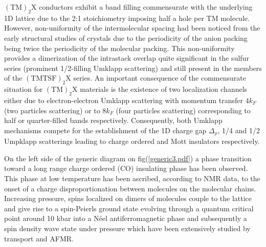 \documentclass[11pt]{article} %
\begin{document}
$\mathrm{(TM)_{2}X}$ conductors exhibit a band filling  commensurate with the underlying 1D lattice due to  the 2:1 stoichiometry  imposing half a hole per TM molecule. %
However,
non-uniformity of the intermolecular spacing  had been noticed from the early structural studies of \tfx crystals\cite{Ducasse86} due to the periodicity of the anion packing being twice the periodicity of the molecular packing. This non-uniformity provides a dimerization of the intrastack overlap  quite significant  in the sulfur series (prominent 1/2-filling Umklapp scattering)  and  still present in the members of the  
$\mathrm{(TMTSF)_{2}X}$ series. 
An important  consequence of the commensurate situation for $\mathrm{(TM)_{2}X}$ materials is the existence of two localization channels either due to electron-electron Umklapp scattering with momentum transfer $4k_F$ (two particles scattering) or to $8k_F$ (four particles scattering) corresponding to half or quarter-filled bands respectively\cite{Emery82,Giamarchi97}. Consequently, both Umklapp mechanisms compete for the establishment of the 1D charge gap $\Delta_{\rho}$, 1/4  and 1/2 Umpklapp scatterings leading to charge ordered and Mott insulators respectively\cite{Tsuchiizu01}. %


On  the  left side of the generic diagram on fig(\ref{generic3.pdf}) a phase transition toward a long range charge ordered (CO) insulating phase has been observed. This phase at low temperature has been  ascribed, according to NMR data, to the onset of a charge  disproportionation between molecules on the molecular chains\cite{Chow00a}.  %
Increasing pressure, spins localized on dimers of molecules couple to the lattice and give rise to a spin-Peierls ground state evolving  through a quantum critical point around 10 kbar\cite{Chow98}  into a N\'eel antiferromagnetic phase and subsequently a spin density wave state  under pressure which have been extensively studied by  transport\cite{Jerome04} and AFMR\cite{Coulon04}.
\end{document}
